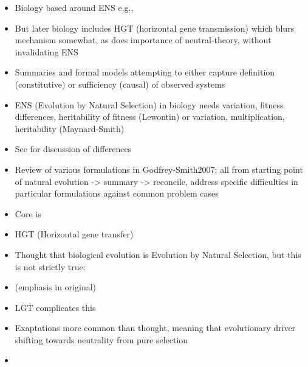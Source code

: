 \begin{itemize}
	\item
	      Biology based around ENS e.g., 
	\item
	      But later biology includes HGT (horizontal gene transmission) which
	      blurs mechanism somewhat, as does importance of neutral-theory,
	      without invalidating ENS
	\item
	      Summaries and formal models attempting to either capture definition
	      (constitutive) or sufficiency (causal) of observed systems
	\item
	      ENS (Evolution by Natural Selection) in biology needs variation,
	      fitness differences, heritability of fitness (Lewontin) or variation,
	      multiplication, heritability (Maynard-Smith)
	\item
	      See \autocite{Griesemer2001} for discussion of differences
	\item
	      Review of various formulations in Godfrey-Smith2007; all from starting
	      point of natural evolution -\textgreater{} summary -\textgreater{}
	      reconcile, address specific difficulties in particular formulations
	      against common problem cases
	\item
	      Core is 
	\item
	      HGT (Horizontal gene transfer)
	\item
	      Thought that biological evolution is Evolution by Natural Selection,
	      but this is not strictly true:
	\item
	      (emphasis in original)
	\item
	      LGT complicates this
	\item
	      Exaptations more common than thought, meaning that evolutionary driver
	      shifting towards neutrality from pure selection \autocite{Barve2013}
	\item

\end{itemize}

